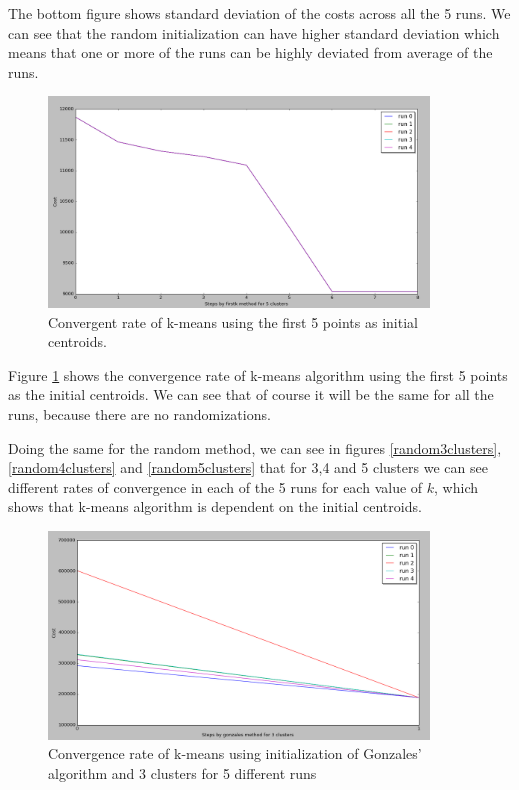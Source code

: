 The bottom figure shows standard deviation of the costs across all the 5 runs. We can see that the random initialization can have higher standard deviation which means that one or more of the runs can be highly deviated from average of the runs.

\begin{figure}[!htb]
\centering
\includegraphics[width=0.9\textwidth]{shots/firstk5clusters.png}
\caption{Convergent rate of k-means using the first 5 points as initial centroids. }
\label{firstk5clusters}
\end{figure}

Figure \ref{firstk5clusters} shows the convergence rate of k-means algorithm using the first 5 points as the initial centroids. We can see that of course it will be the same for all the runs, because there are no randomizations.

Doing the same for the random method, we can see in figures \ref{random3clusters}, \ref{random4clusters} and \ref{random5clusters} that for 3,4 and 5 clusters we can see different rates of convergence in each of the 5 runs for each value of $k$, which shows that k-means algorithm is dependent on the initial centroids.

\begin{figure}[!htb]
\centering
\includegraphics[width=0.9\textwidth]{shots/gonzales3clusters.png}
\caption{Convergence rate of k-means using initialization of Gonzales' algorithm and 3 clusters for 5 different runs }
\label{gonzales3clusters}
\end{figure}

